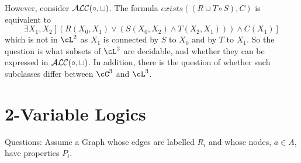 However, consider ${\cal ALC}(\circ,\sqcup)$.  The formula $exists((R
\sqcup T \circ S),C)$ is equivalent to 
\[
\exists X_1,X_2 [(R(X_0,X_1) \vee (S(X_0,X_2) \wedge T(X_2,X_1)))
	\wedge C(X_1)]
\]
which is not in $\cL^2$ as $X_1$ is connected by $S$ to $X_0$ and by
$T$ to $X_1$.  So the question is what subsets of $\cL^3$ are
decidable, and whether they can be expressed in ${\cal
ALC(\circ,\sqcup)}$.  In addition, there is the question of whether
such subclasses differ between $\cC^3$ and $\cL^3$.

\section{2-Variable Logics}

Questions: Assume a Graph whose edges are labelled $R_i$ and whose
nodes, $a \in A$, have properties $P_i$.

